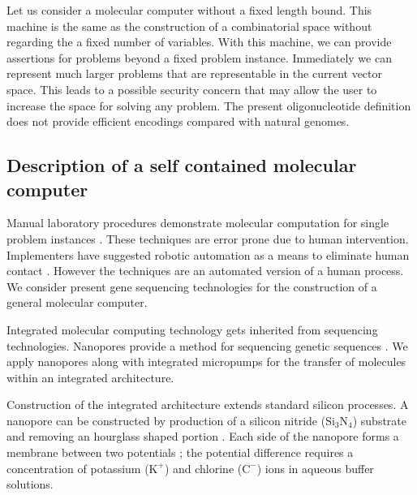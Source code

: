 Let us consider a molecular computer without a fixed length bound.  This machine is the same as the construction of a combinatorial space without regarding the a fixed number of variables.  With this machine, we can provide assertions for problems beyond a fixed problem instance.  Immediately we can represent much larger problems that are representable in the current vector space.  This leads to a possible security concern that may allow the user to increase the space for solving any problem.  The present oligonucleotide definition does not provide efficient encodings compared with natural genomes. 

			
		\subsection{Description of a self contained molecular computer}
		
Manual laboratory procedures demonstrate molecular computation for single problem instances \cite{Adleman:1994:MCS:189441.189442, dnaBasedImplemetation_Yoshida2000, faulhammer2000mol, Braich02solutionof}.  These techniques are error prone due to human intervention.  Implementers have suggested robotic automation as a means to eliminate human contact \cite{dnaBasedImplemetation_Yoshida2000}.  However the techniques are an automated version of a human process.  We consider present gene sequencing technologies for the construction of a general molecular computer.
			
Integrated molecular computing technology gets inherited from sequencing technologies.  Nanopores provide a method for sequencing genetic sequences \cite{dnaTransistorIBMpressrelease, nanoporeChapter11, ionTorrent, oxfordNanopore}.  We apply nanopores along with integrated micropumps \cite{Liao_Lee_Liu_Hsieh_Luo_2005} for the transfer of molecules within an integrated architecture.     
			
Construction of the integrated architecture extends standard silicon processes.  A nanopore can be constructed by production of a silicon nitride ($\text{Si}_3\text{N}_4$) substrate and removing an hourglass shaped portion \cite{Heng_Aksimentiev_Ho_Marks_Grinkova_Sligar_Schulten_Timp_2006}.  Each side of the nanopore forms a membrane between two potentials \cite{Heng_Aksimentiev_Ho_Marks_Grinkova_Sligar_Schulten_Timp_2006}; the potential difference requires a concentration of potassium ($\text{K}^+$) and chlorine ($\text{C}^-$) ions in aqueous buffer solutions.  
	
